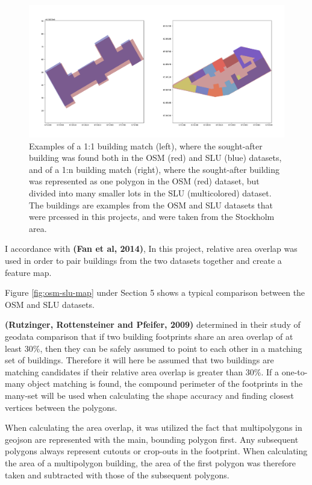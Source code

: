 \documentclass{kththesis}
\begin{document}
\begin{figure}[H]
    \centering
    \includegraphics[width=\textwidth,height=0.5\textheight,keepaspectratio]{img_building_match}
    \caption{Examples of a 1:1 building match (left), where the sought-after building was found both in the OSM (red) and SLU (blue) datasets, and of a 1:n building match (right), where the sought-after building was represented as one polygon in the OSM (red) dataset, but divided into many smaller lots in the SLU (multicolored) dataset. The buildings are examples from the OSM and SLU datasets that were prcessed in this projects, and were taken from the Stockholm area.}
    \label{fig:building-match-types}
\end{figure}

I accordance with \textbf{(Fan et al, 2014)}, 
In this project, relative area overlap was used in order to pair buildings from the two datasets together and create a feature map.

Figure \ref{fig:osm-slu-map} under Section 5 shows a typical comparison between the OSM and SLU datasets.

\textbf{(Rutzinger, Rottensteiner and Pfeifer, 2009)} determined in their study of geodata comparison that if two building footprints share an area overlap of at least 30\%, then they can be safely assumed to point to each other in a matching set of buildings.
Therefore it will here be assumed that two buildings are matching candidates if their relative area overlap is greater than 30\%.
If a one-to-many object matching is found, the compound perimeter of the footprints in the many-set will be used when calculating the shape accuracy and finding closest vertices between the polygons.

When calculating the area overlap, it was utilized the fact that multipolygons in geojson are represented with the main, bounding polygon first.
Any subsequent polygons always represent cutouts or crop-outs in the footprint.
When calculating the area of a multipolygon building, the area of the first polygon was therefore taken and subtracted with those of the subsequent polygons.
\end{document}
